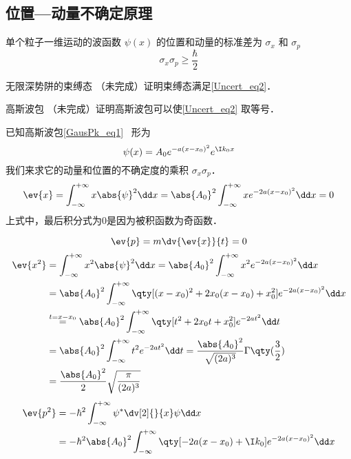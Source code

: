 

\subsection{位置—动量不确定原理}
单个粒子一维运动的波函数 $\psi(x)$ 的位置和动量的标准差为 $\sigma_x$ 和 $\sigma_p$
\begin{equation}\label{Uncert_eq2}
\sigma_x \sigma_p \geqslant \frac{\hbar}{2}
\end{equation}

\begin{example}{无限深势阱的束缚态}\label{Uncert_ex2}
（未完成）证明束缚态满足\autoref{Uncert_eq2}．
\end{example}

\begin{example}{高斯波包}\label{Uncert_ex1}
（未完成）证明高斯波包可以使\autoref{Uncert_eq2} 取等号．

已知高斯波包\autoref{GausPk_eq1}~ 形为
\begin{equation}
\psi(x)=A_0e^{-a(x-x_0)^2}e^{\I k_0x}
\end{equation}
我们来求它的动量和位置的不确定度的乘积 $\sigma_x\sigma_p$．
\begin{equation}
\ev{x}=\int_{-\infty}^{+\infty}x\abs{\psi}^2\dd x=\abs{A_0}^2\int_{-\infty}^{+\infty}xe^{-2a(x-x_0)^2}\dd x=0
\end{equation}
上式中，最后积分式为0是因为被积函数为奇函数．

\begin{equation}
\ev{p}=m\dv{\ev{x}}{t}=0
\end{equation}
\begin{equation}
\begin{aligned}
\ev{x^2}&=\int_{-\infty}^{+\infty}x^2\abs{\psi}^2\dd x=\abs{A_0}^2\int_{-\infty}^{+\infty}x^2e^{-2a(x-x_0)^2}\dd x\\
&=\abs{A_0}^2\int_{-\infty}^{+\infty}\qty[(x-x_0)^2+2x_0(x-x_0)+x_0^2]e^{-2a(x-x_0)^2}\dd x\\
&\overset{t=x-x_0}{=}\abs{A_0}^2\int_{-\infty}^{+\infty}\qty[t^2+2x_0t+x_0^2]e^{-2at^2}\dd t\\
&=\abs{A_0}^2\int_{-\infty}^{+\infty}t^2e^{-2at^2}\dd t
=\frac{\abs{A_0}^2}{\sqrt{(2a)^3}}\Gamma\qty(\frac{3}{2})\\
&=\frac{\abs{A_0}^2}{2}\sqrt{\frac{\pi}{(2a)^3}}
\end{aligned}
\end{equation}
\begin{equation}
\begin{aligned}
\ev{p^2}&=-\hbar^2 \int_{-\infty}^{+\infty}\psi^{*}\dv[2]{}{x}\psi\dd x\\
&=-\hbar^2\abs{A_0}^2\int_{-\infty}^{+\infty}\qty[-2a(x-x_0)+\I k_0]e^{-2a(x-x_0)^2}\dd x\\
\end{aligned}
\end{equation}

\end{example}

